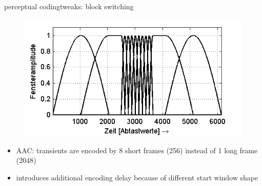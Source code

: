 	\begin{frame}{perceptual coding}{tweaks: block switching}
			\begin{figure}
				\centering
					\includegraphics[scale=0.9]{Graph/Lerch16-4}
			\end{figure}
            \begin{itemize}
                \item   AAC: transients are encoded by 8 short frames (256) instead of 1 long frame (2048)
                \item   introduces additional encoding delay because of different start window shape
            \end{itemize}
	\end{frame}
    
